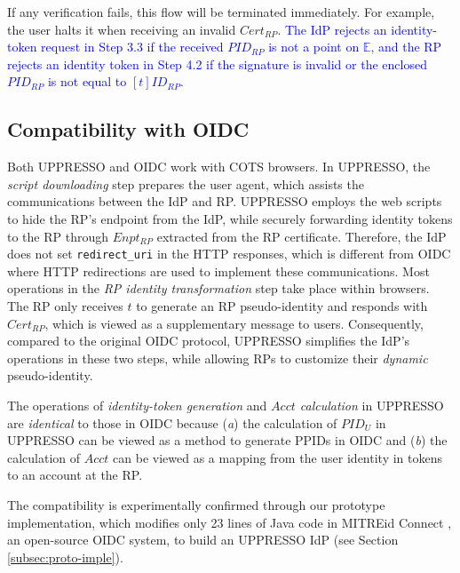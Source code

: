 If any verification fails, this flow will be terminated immediately.
For example, the user halts it when receiving an invalid $Cert_{RP}$.
\textcolor{blue}{The IdP rejects an identity-token request in Step 3.3 if the received $PID_{RP}$ is not a point on $\mathbb{E}$, and the RP rejects an identity token in Step 4.2 if the signature is invalid or the enclosed $PID_{RP}$ is not equal to $[t]ID_{RP}$.}



\subsection{Compatibility with OIDC}
\label{subsec:compatible}
Both UPPRESSO and OIDC work with COTS browsers. %
In UPPRESSO, the \emph{script downloading} step prepares the user agent, which assists the communications between the IdP and RP. UPPRESSO employs the web scripts to hide the RP's endpoint from the IdP, while securely forwarding identity tokens to the RP through $Enpt_{RP}$ extracted from the RP certificate.
Therefore, the IdP does not set \verb+redirect_uri+ in the HTTP responses, which is different from OIDC where HTTP redirections are used to implement these communications. Most operations in the \emph{RP identity transformation} step take place within browsers. The RP only receives $t$ to generate an RP pseudo-identity and responds with $Cert_{RP}$,
which is viewed as a supplementary message to users.
Consequently, compared to the original OIDC protocol, UPPRESSO simplifies the IdP's operations in these two steps, while allowing RPs to customize their \emph{dynamic} pseudo-identity.

The operations of \emph{identity-token generation} and \emph{$Acct$ calculation} in UPPRESSO are \emph{identical} to those in OIDC because (\emph{a}) the calculation of $PID_U$ in UPPRESSO can be viewed as a method to generate PPIDs in OIDC and (\emph{b}) the calculation of $Acct$ can be viewed as a mapping from the user identity in tokens to an account at the RP.

The compatibility is experimentally confirmed through our prototype implementation, which modifies only 23 lines of Java code in MITREid Connect \cite{MITREid}, an open-source OIDC system, to build an UPPRESSO IdP (see Section \ref{subsec:proto-imple}).

